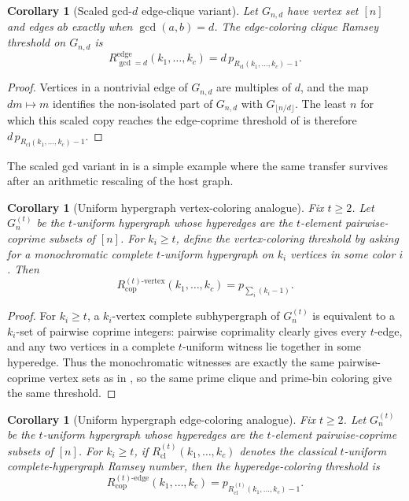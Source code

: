 \documentclass[11pt]{article}
\theoremstyle{plain}
\newtheorem{corollary}[theorem]{Corollary}
\theoremstyle{definition}
\theoremstyle{remark}
\newcommand{\Rcl}{R_{\mathrm{cl}}}
\begin{document}
\begin{corollary}[Scaled gcd-$d$ edge-clique variant]
\label{cor:gcd-scaling}
Let $G_{n,d}$ have vertex set $[n]$ and edges $ab$ exactly when
$\gcd(a,b)=d$.  The edge-coloring clique Ramsey threshold on $G_{n,d}$ is
\[
  R_{\gcd=d}^{\mathrm{edge}}(k_1,\ldots,k_c)
  =d\,p_{\Rcl(k_1,\ldots,k_c)-1}.
\]
\end{corollary}

\begin{proof}
Vertices in a nontrivial edge of $G_{n,d}$ are multiples of $d$, and the map
$dm\mapsto m$ identifies the non-isolated part of $G_{n,d}$ with
$G_{\lfloor n/d\rfloor}$.  The least $n$ for which this scaled copy reaches
the edge-coprime threshold of  is therefore
$d\,p_{\Rcl(k_1,\ldots,k_c)-1}$.
\end{proof}

The scaled gcd variant in  is a simple example where
the same transfer survives after an arithmetic rescaling of the host graph.

\begin{corollary}[Uniform hypergraph vertex-coloring analogue]
\label{cor:hypergraph-vertex}
Fix $t\ge2$.  Let $G_n^{(t)}$ be the $t$-uniform hypergraph whose hyperedges
are the $t$-element pairwise-coprime subsets of $[n]$.  For $k_i\ge t$, define
the vertex-coloring threshold by asking for a monochromatic complete
$t$-uniform hypergraph on $k_i$ vertices in some color $i$.  Then
\[
  R_{\mathrm{cop}}^{(t)\text{-vertex}}(k_1,\ldots,k_c)
  =p_{\sum_i(k_i-1)}.
\]
\end{corollary}

\begin{proof}
For $k_i\ge t$, a $k_i$-vertex complete subhypergraph of $G_n^{(t)}$ is
equivalent to a $k_i$-set of pairwise coprime integers: pairwise coprimality
clearly gives every $t$-edge, and any two vertices in a complete
$t$-uniform witness lie together in some hyperedge.  Thus the monochromatic
witnesses are exactly the same pairwise-coprime vertex sets as in
, so the same prime clique and prime-bin coloring give the
same threshold.
\end{proof}

\begin{corollary}[Uniform hypergraph edge-coloring analogue]
\label{cor:hypergraph-edge}
Fix $t\ge2$.  Let $G_n^{(t)}$ be the $t$-uniform hypergraph whose hyperedges
are the $t$-element pairwise-coprime subsets of $[n]$.  For $k_i\ge t$, if
$R_{\mathrm{cl}}^{(t)}(k_1,\ldots,k_c)$ denotes the classical $t$-uniform
complete-hypergraph Ramsey number, then the hyperedge-coloring threshold is
\[
  R_{\mathrm{cop}}^{(t)\text{-edge}}(k_1,\ldots,k_c)
  =p_{R_{\mathrm{cl}}^{(t)}(k_1,\ldots,k_c)-1}.
\]
\end{corollary}
\end{document}
